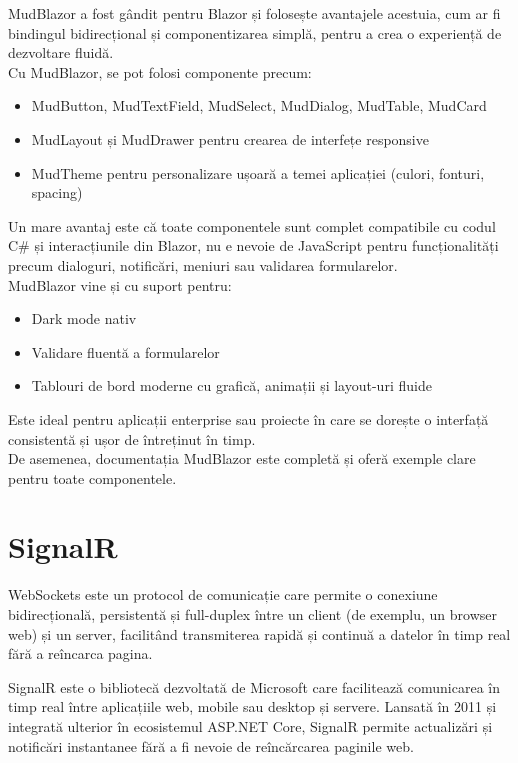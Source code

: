 MudBlazor a fost gândit pentru Blazor și folosește avantajele acestuia, cum ar fi bindingul bidirecțional și
componentizarea simplă, pentru a crea o experiență de dezvoltare fluidă. \parencite{mudblazor}
\\Cu MudBlazor, se pot folosi componente precum:
\begin{itemize}
    \item MudButton, MudTextField, MudSelect, MudDialog, MudTable, MudCard
    \item MudLayout și MudDrawer pentru crearea de interfețe responsive
    \item MudTheme pentru personalizare ușoară a temei aplicației (culori, fonturi, spacing)
\end{itemize}
\parencite{mudblazor}

Un mare avantaj este că toate componentele sunt complet compatibile cu codul C\# și interacțiunile din Blazor,
nu e nevoie de JavaScript pentru funcționalități precum dialoguri, notificări, meniuri sau validarea
formularelor. \parencite{mudblazor}
\\MudBlazor vine și cu suport pentru:
\begin{itemize}
    \item Dark mode nativ
    \item Validare fluentă a formularelor
    \item Tablouri de bord moderne cu grafică, animații și layout-uri fluide
\end{itemize}
\parencite{mudblazor}

Este ideal pentru aplicații enterprise sau proiecte în care se dorește o interfață consistentă și ușor de
întreținut în timp. \parencite{mudblazor}
\\De asemenea, documentația MudBlazor este completă și oferă exemple clare pentru toate
componentele.

\section{SignalR}
WebSockets este un protocol de comunicație care permite o conexiune bidirecțională, persistentă și full-duplex între un client (de exemplu, un browser web) și un server, facilitând transmiterea rapidă și continuă a datelor în timp real fără a reîncarca pagina. \parencite{signalR}

SignalR este o bibliotecă dezvoltată de Microsoft care facilitează comunicarea în timp real între aplicațiile web, mobile sau desktop și servere. Lansată în 2011 și integrată ulterior în ecosistemul ASP.NET Core, SignalR permite actualizări și notificări instantanee fără a fi nevoie de reîncărcarea paginile web. \parencite{signalR}

